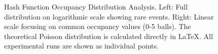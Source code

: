 \begin{figure}[p]
    \caption{Hash Function Occupancy Distribution Analysis. Left: Full distribution on logarithmic scale showing rare events. Right: Linear scale focusing on common occupancy values (0-5 balls). The theoretical Poisson distribution is calculated directly in LaTeX. All experimental runs are shown as individual points.}
    \label{fig:occupancy_analysis}
\end{figure} 